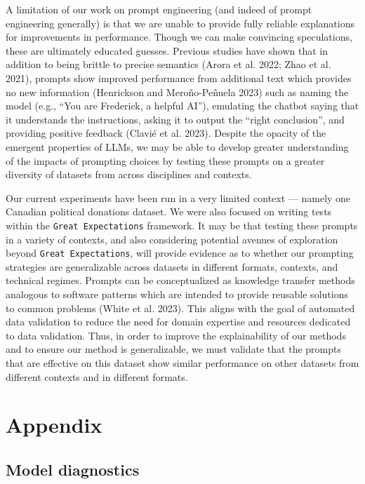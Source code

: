 \documentclass[
  letterpaper,
  DIV=11,
  numbers=noendperiod]{scrartcl}
\begin{document}
A limitation of our work on prompt engineering (and indeed of prompt
engineering generally) is that we are unable to provide fully reliable
explanations for improvements in performance. Though we can make
convincing speculations, these are ultimately educated guesses. Previous
studies have shown that in addition to being brittle to precise
semantics (Arora et al. 2022; Zhao et al. 2021), prompts show improved
performance from additional text which provides no new information
(Henrickson and Meroño-Peñuela 2023) such as naming the model (e.g.,
``You are Frederick, a helpful AI''), emulating the chatbot saying that
it understands the instructions, asking it to output the ``right
conclusion'', and providing positive feedback (Clavié et al. 2023).
Despite the opacity of the emergent properties of LLMs, we may be able
to develop greater understanding of the impacts of prompting choices by
testing these prompts on a greater diversity of datasets from across
disciplines and contexts.

Our current experiments have been run in a very limited context ---
namely one Canadian political donations dataset. We were also focused on
writing tests within the \texttt{Great\ Expectations} framework. It may
be that testing these prompts in a variety of contexts, and also
considering potential avenues of exploration beyond
\texttt{Great\ Expectations}, will provide evidence as to whether our
prompting strategies are generalizable across datasets in different
formats, contexts, and technical regimes. Prompts can be conceptualized
as knowledge transfer methods analogous to software patterns which are
intended to provide reusable solutions to common problems (White et al.
2023). This aligns with the goal of automated data validation to reduce
the need for domain expertise and resources dedicated to data
validation. Thus, in order to improve the explainability of our methods
and to ensure our method is generalizable, we must validate that the
prompts that are effective on this dataset show similar performance on
other datasets from different contexts and in different formats.

\newpage

\hypertarget{appendix}{%
\section{Appendix}\label{appendix}}

\hypertarget{sec-diagnostics}{%
\subsection{Model diagnostics}\label{sec-diagnostics}}
\end{document}
